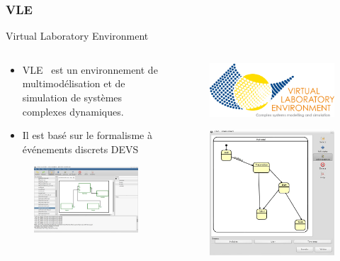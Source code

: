 \documentclass[xetex, compress, table, svgnames]{beamer}
\begin{document}
\begin{frame}
  \frametitle{VLE}
  \begin{block}{Virtual Laboratory Environment}
    \begin{columns}
      \begin{column}{.47\textwidth}
        \begin{itemize}
        \item VLE~\cite{quesnel09} est un environnement de
          multimodélisation et de simulation de systèmes complexes
          dynamiques.
        \item Il est basé sur le formalisme à événements discrets
          \alert{DEVS}~\cite{zeigler00}
        \end{itemize}
        \begin{figure}
          \centering
          \includegraphics[width=.7\textwidth]{gvle}
        \end{figure}
      \end{column}
      \begin{column}{.47\textwidth}
        \begin{figure}
          \centering
          \includegraphics[width=.7\textwidth]{yellowvle}
        \end{figure}
        \begin{figure}
          \centering
          \includegraphics[width=.7\textwidth]{fsa}

\end{figure}
\end{column}
\end{columns}
\end{block}
\end{frame}
\end{document}
